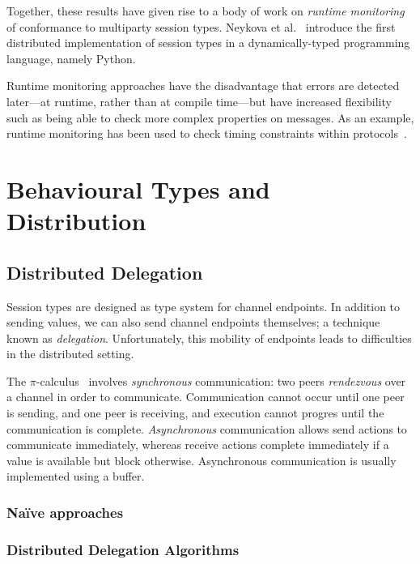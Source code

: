 \documentclass[
graybox,
envcountchap
]{svmult}
\begin{document}
\begin{bibunit}
  Together, these results have given rise to a body of work on \emph{runtime
  monitoring} of conformance to multiparty session types. Neykova et
  al.~\cite{NeykovaYH13:spy} introduce the first distributed implementation of
  session types in a dynamically-typed programming language, namely Python.

  Runtime monitoring approaches have the disadvantage that errors are detected
  later---at runtime, rather than at compile time---but have increased
  flexibility such as being able to check more complex properties on messages.
  As an example, runtime monitoring has been used to check timing
  constraints within protocols~\cite{NeykovaBY17:timed-monitoring}.


  \section{Behavioural Types and Distribution}\label{sec:bt:distrib}

  \subsection{Distributed Delegation}\label{sec:bt:distrib-deleg}
  Session types are designed as type system for channel endpoints.
  In addition to sending values, we can also send channel endpoints themselves;
  a technique known as \emph{delegation}. Unfortunately, this mobility of
  endpoints leads to difficulties in the distributed setting.

  The $\pi$-calculus~\cite{Milner99:pi-calc} involves \emph{synchronous}
  communication: two peers \emph{rendezvous} over a channel in order to
  communicate. Communication cannot occur until one peer is sending, and one
  peer is receiving, and execution cannot progres until the communication is
  complete. \emph{Asynchronous} communication allows send actions to communicate
  immediately, whereas receive actions complete immediately if a value is
  available but block otherwise.  Asynchronous communication is usually
  implemented using a buffer.


  \subsubsection{Na\"ive approaches}
  \subsubsection{Distributed Delegation Algorithms}


\end{bibunit}
\end{document}
